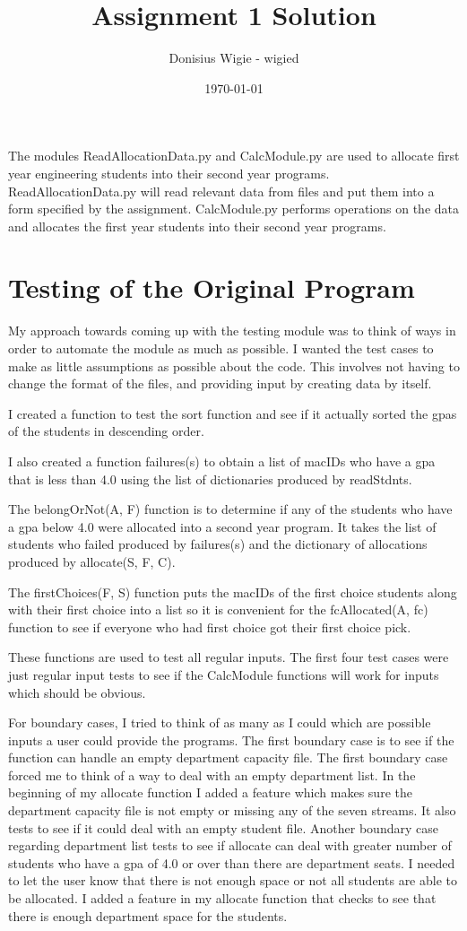 \documentclass[12pt]{article}
\title{Assignment 1 Solution}
\author{Donisius Wigie - wigied}
\date{\today}
\begin{document}
\maketitle

The modules ReadAllocationData.py and CalcModule.py are used to allocate first year engineering students into their second year programs. ReadAllocationData.py will read relevant data from files and put them into a form specified by the assignment. CalcModule.py performs operations on the data and allocates the first year students into their second year programs.

\section{Testing of the Original Program}

My approach towards coming up with the testing module was to think of ways in order to automate the module as much as possible. I wanted the test cases to make as little assumptions as possible about the code. This involves not having to change the format of the files, and providing input by creating data by itself.

I created a function to test the sort function and see if it actually sorted the gpas of the students in descending order. 

I also created a function failures(s) to obtain a list of macIDs who have a gpa that is less than 4.0 using the list of dictionaries produced by readStdnts.

The belongOrNot(A, F) function is to determine if any of the students who have a gpa below 4.0 were allocated into a second year program. It takes the list of students who failed produced by  failures(s) and the dictionary of allocations produced by allocate(S, F, C). 

The firstChoices(F, S) function puts the macIDs of the first choice students along with their first choice into a list so it is convenient for the fcAllocated(A, fc) function to see if everyone who had first choice got their first choice pick.

These functions are used to test all regular inputs. The first four test cases were just regular input tests to see if the CalcModule functions will work for inputs which should be obvious.

For boundary cases, I tried to think of as many as I could which are possible inputs a user could provide the programs. The first boundary case is to see if the function can handle an empty department capacity file. The first boundary case forced me to think of a way to deal with an empty department list. In the beginning of my allocate function I added a feature which makes sure the department capacity file is not empty or missing any of the seven streams. It also tests to see if it could deal with an empty student file. Another boundary case regarding department list tests to see if allocate can deal with greater number of students who have a gpa of 4.0 or over than there are department seats. I needed to let the user know that there is not enough space or not all students are able to be allocated. I added a feature in my allocate function that checks to see that there is enough department space for the students.
\end{document}
